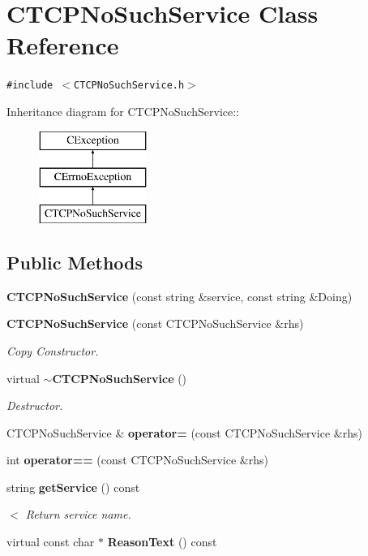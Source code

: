 \section{CTCPNo\-Such\-Service  Class Reference}
\label{classCTCPNoSuchService}
{\tt \#include $<$CTCPNo\-Such\-Service.h$>$}

Inheritance diagram for CTCPNo\-Such\-Service::\begin{figure}[H]
\begin{center}
\leavevmode
\includegraphics[height=3cm]{classCTCPNoSuchService}
\end{center}
\end{figure}
\subsection*{Public Methods}
\begin{CompactItemize}
\item 
{\bf CTCPNo\-Such\-Service} (const string \&service, const string \&Doing)
\item 
{\bf CTCPNo\-Such\-Service} (const CTCPNo\-Such\-Service \&rhs)
\begin{CompactList}\small\item\em Copy Constructor.\item\end{CompactList}\item 
virtual {\bf $\sim$CTCPNo\-Such\-Service} ()
\begin{CompactList}\small\item\em Destructor.\item\end{CompactList}\item 
CTCPNo\-Such\-Service \& {\bf operator=} (const CTCPNo\-Such\-Service \&rhs)
\item 
int {\bf operator==} (const CTCPNo\-Such\-Service \&rhs)
\item 
string {\bf get\-Service} () const
\begin{CompactList}\small\item\em $<$ Return service name.\item\end{CompactList}\item 
virtual const char $\ast$ {\bf Reason\-Text} () const
\end{CompactItemize}
